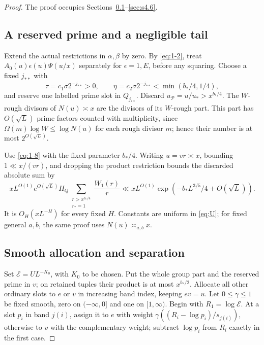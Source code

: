 \documentclass[11pt]{article}
\theoremstyle{definition}
\theoremstyle{definition}
\begin{document}
\begin{proof}
The proof occupies Sections~\ref{sec:s4.1}--\ref{sec:s4.6}.
\subsection{A reserved prime and a negligible tail}\label{sec:s4.1}

Extend the actual restrictions in \(\alpha,\beta\) by zero. By \eqref{eq:1-2}, treat \(A_0(u)\epsilon(u)\Psi(u/x)\) separately for \(\epsilon=1,E\), before any squaring. Choose a fixed \(j_{**}\) with
\begin{equation*}
\tau=c_1\sigma2^{-j_{**}}>0,\qquad
 \eta=c_2\sigma2^{-j_{**}}<\min(b_*/4,1/4),
\end{equation*}
and reserve one labelled prime slot in \(Q_{j_{**}}\). Discard \(u_{\mathcal P}=u/u_*>x^{b_*/4}\). The \(W\)-rough divisors of \(N(u)\asymp x\) are the divisors of its \(W\)-rough part. This part has \(O(\sqrt L)\) prime factors counted with multiplicity, since \(\Omega(m)\log W\le\log N(u)\) for each rough divisor \(m\); hence their number is at most \(2^{O(\sqrt L)}\).

Use \eqref{eq:1-8} with the fixed parameter \(b_*/4\). Writing \(u=vr\asymp x\), bounding \(1\ll x/(vr)\), and dropping the product restriction bounds the discarded absolute sum by
\begin{equation}
xL^{O(1)}e^{O(\sqrt L)}
 H_Q\sum_{\substack{r>x^{b_*/4}\\r_*=1}}\frac{W_1(r)}r
 \ll xL^{O(1)}\exp(-b_*L^{3/5}/4+O(\sqrt L)).            \tag{4.3}\label{eq:4-3}
\end{equation}
It is \(O_H(xL^{-H})\) for every fixed \(H\). Constants are uniform in \eqref{eq:U}; for fixed general \(a,b\), the same proof uses \(N(u)\asymp_{a,b}x\).

\subsection{Smooth allocation and separation}\label{sec:s4.2}

Set \(\mathcal E=UL^{-K_0}\), with \(K_0\) to be chosen. Put the whole group part and the reserved prime in \(v\); on retained tuples their product is at most \(x^{b_*/2}\). Allocate all other ordinary slots to \(e\) or \(v\) in increasing band index, keeping \(ev=u\). Let \(0\le\gamma\le1\) be fixed smooth, zero on \((-\infty,0]\) and one on \([1,\infty)\). Begin with \(R_1=\log\mathcal E\). At a slot \(p_i\) in band \(j(i)\), assign it to \(e\) with weight \(\gamma((R_i-\log p_i)/s_{j(i)})\), otherwise to \(v\) with the complementary weight; subtract \(\log p_i\) from \(R_i\) exactly in the first case.


\end{proof}
\end{document}
